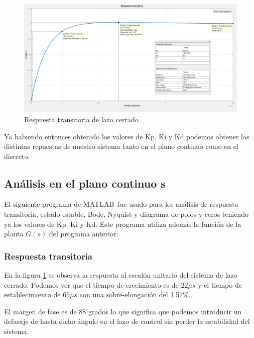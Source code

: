 \documentclass[12pt]{report}
\begin{document}
	\begin{figure}
		\centering
		\includegraphics[width=\textwidth,height=\textheight,keepaspectratio]{buck_step_response} 
		\caption{Respuesta transitoria de lazo cerrado}
		\label{buck:settling_time}
	\end{figure}

	\newpage
	Ya habiendo entonces obtenido los valores de Kp, Ki y Kd podemos obtener las distintas repuestas de nuestro sistema tanto en el plano continuo como en el discreto.

	\subsection{Análisis en el plano continuo s}
	
	El siguiente programa de MATLAB\textregistered \ fue usado para los análisis de respuesta transitoria, estado estable, Bode, Nyquist y diagrama de polos y ceros teniendo ya los valores de Kp, Ki y Kd. Este programa utiliza además la función de la planta $G(s)$ del programa anterior:
	
	
	
	\subsubsection{Respuesta transitoria}
	
	En la figura \ref{buck:settling_time} se observa la respuesta al escalón unitario del sistema de lazo cerrado. Podemos ver que el tiempo de crecimiento es de $22 \mu s$ y el tiempo de establecimiento de $65 \mu s$ con una sobre-elongación del 1.57\%. 
	
	El margen de fase es de 88 grados lo que significa que podemos introducir un defasaje de hasta dicho ángulo en el lazo de control sin perder la estabilidad del sistema.
	
\end{document}
